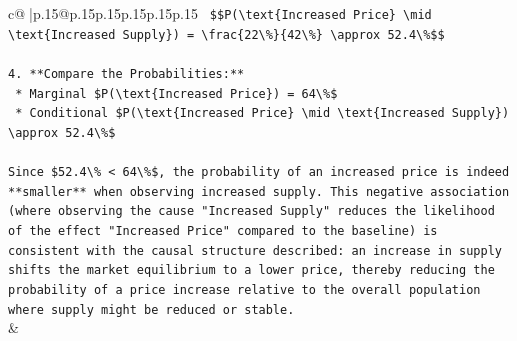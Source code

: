 \documentclass{article}
\begin{document}
{\begin{supertabular}{c@{$\;$}|p{.15\linewidth}@{}p{.15\linewidth}p{.15\linewidth}p{.15\linewidth}p{.15\linewidth}p{.15\linewidth}}
{{{\texttt{    \$\$P(\textbackslash{}text\{Increased Price\} \textbackslash{}mid \textbackslash{}text\{Increased Supply\}) = \textbackslash{}frac\{22\textbackslash{}\%\}\{42\textbackslash{}\%\} \textbackslash{}approx 52.4\textbackslash{}\%\$\$} \\
\\ 
\texttt{4.  **Compare the Probabilities:**} \\
\texttt{    *   Marginal \$P(\textbackslash{}text\{Increased Price\}) = 64\textbackslash{}\%\$} \\
\texttt{    *   Conditional \$P(\textbackslash{}text\{Increased Price\} \textbackslash{}mid \textbackslash{}text\{Increased Supply\}) \textbackslash{}approx 52.4\textbackslash{}\%\$} \\
\\ 
\texttt{Since \$52.4\textbackslash{}\% < 64\textbackslash{}\%\$, the probability of an increased price is indeed **smaller** when observing increased supply. This negative association (where observing the cause "Increased Supply" reduces the likelihood of the effect "Increased Price" compared to the baseline) is consistent with the causal structure described: an increase in supply shifts the market equilibrium to a lower price, thereby reducing the probability of a price increase relative to the overall population where supply might be reduced or stable.} \\
            }
        }
    }
    & \\ \\


\end{supertabular}}
\end{document}
